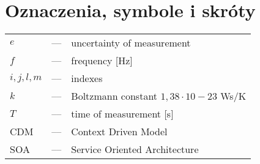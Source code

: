 \chapter*{Oznaczenia, symbole i skróty}

\noindent
\begin{tabularx}{\textwidth}{p{1.25cm}p{0.75cm}X}
	$e$				& ---	& uncertainty of measurement \\
	$f$				& ---	& frequency [Hz] \\
	$i, j, l, m$	& --–	& indexes \\
	$k$				& --–	& Boltzmann constant $1,38 \cdot 10-23$ Ws/K \\
	$T$ 			& --– 	& time of measurement [s] \\
	CDM				& --– 	& Context Driven Model \\
	SOA				& --– 	& Service Oriented Architecture
	
	
\end{tabularx}

